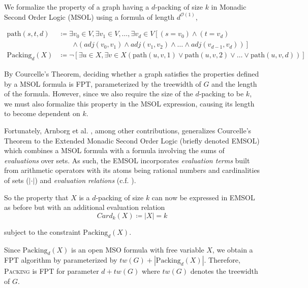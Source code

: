 \documentclass[10pt, a4paper]{article}
\theoremstyle{definition}
\newcommand{\mcO}{\mathcal{O}}
\begin{document}
We formalize the property of a graph having a $d$-packing of size $k$ in Monadic Second Order Logic (MSOL) using a formula of length $d^{\mcO(1)}$,

\begin{align*}
	\mathrm{path}(s, t, d) 		&\coloneqq \exists v_0 \in V, \exists v_1 \in V, \dotsc, \exists v_d \in V
									\left [ (s=v_0) \wedge (t=v_d) \right.\nonumber \\
								&\qquad \left. \wedge (adj(v_0, v_1) \wedge adj(v_1, v_2) 
									\wedge \dots \wedge adj(v_{d-1}, v_d)) \right ] \\
	\mathrm{Packing}_d(X)	&\coloneqq \neg \left [\exists u \in X, \exists v \in X (\mathrm{path}(u, v, 1) 
									\vee \mathrm{path}(u, v, 2) \vee \dots \vee \mathrm{path}(u, v, d) ) \right ]
\end{align*}

By Courcelle's Theorem, deciding whether a graph satisfies the properties defined by a MSOL formula is FPT, parameterized by the treewidth of $G$ and the length of the formula. However, since we also require the size of the $d$-packing to be $k$, we must also formalize this property in the MSOL expression, causing its length to become dependent on $k$.

Fortunately, Arnborg et al. \cite{Arnborg1991}, among other contributions, generalizes Courcelle's Theorem to the Extended Monadic Second Order Logic (briefly denoted EMSOL) which combines a MSOL formula with a formula involving the sums of \textit{evaluations} over sets. As such, the EMSOL incorporates \textit{evaluation terms} built from arithmetic operators with its atoms being rational numbers and cardinalities of sets ($|\cdot|$) and \textit{evaluation relations} (c.f. \cite[p.~316]{Arnborg1991}).

So the property that $X$ is a $d$-packing of size $k$ can now be expressed in EMSOL as before but with an additional evaluation relation
\begin{equation*}
	Card_k(X)	\coloneqq |X| = k
\end{equation*}

subject to the constraint $\mathrm{Packing}_d(X)$.

Since $\mathrm{Packing}_d(X)$ is an open MSO formula with free variable $X$, we obtain a FPT algorithm by \cite{Arnborg1991} parameterized by $tw(G)+|\mathrm{Packing}_d(X)|$. Therefore, \textsc{Packing} is FPT for parameter $d+tw(G)$ where $tw(G)$ denotes the treewidth of $G$.



\end{document}
